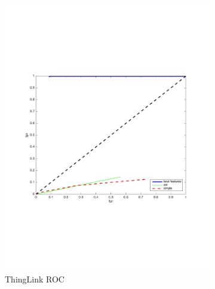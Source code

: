 \documentclass[english,12pt,a4paper,pdftex,elec,utf8, table]{aaltothesis}
\begin{document}
\begin{figure}[htb]
\begin{center}
\begin{subfigure}[b]{0.49\textwidth}
    \includegraphics[width=\textwidth]{figures/thinglink_Border10ROC.pdf}
    \caption{ThingLink ROC}
    \label{Borderpr}
  \end{subfigure}
  \begin{subfigure}[b]{0.49\textwidth}

\end{subfigure}
\end{center}
\end{figure}
\end{document}
